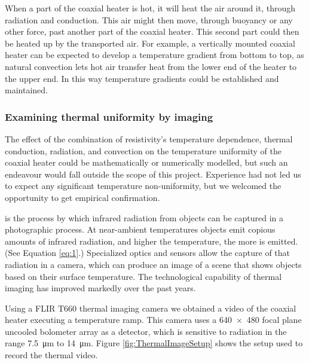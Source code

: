 When a part of the coaxial heater is hot, it will heat the air around it,
through radiation and conduction. This air might then move, through buoyancy or
any other force, past another part of the coaxial heater. This second part could
then be heated up by the transported air. For example, a vertically mounted
coaxial heater can be expected to develop a temperature gradient from bottom to
top, as natural convection lets hot air transfer heat from the lower end of the
heater to the upper end. In this way temperature gradients could be established
and maintained.

\subsubsection{Examining thermal uniformity by imaging}

The effect of the combination of resistivity's temperature dependence, thermal
conduction, radiation, and convection on the temperature uniformity of the
coaxial heater could be mathematically or numerically modelled, but such an
endeavour would fall outside the scope of this project. Experience had not led
us to expect any significant temperature non-uniformity, but we welcomed the 
opportunity to get empirical confirmation.

 is the process by which infrared radiation from objects
can be captured in a photographic process. At near-ambient temperatures objects
emit copious amounts of infrared radiation, and higher the temperature, the more
is emitted. (See Equation \ref{eq:1}.) Specialized optics and sensors allow the
capture of that radiation in a camera, which can produce an image of a scene
that shows objects based on their surface temperature. The technological
capability of thermal imaging has improved markedly over the past years.

Using a FLIR{\texttrademark} T660 thermal imaging camera we obtained a video of
the coaxial heater executing a temperature ramp. This camera uses a \num{640 x 480}
focal plane uncooled bolometer array as a detector, which is sensitive to
radiation in the range \SI{7.5}{\micro\metre} to \SI{14}{\micro\metre}.
Figure \ref{fig:ThermalImageSetup} shows the setup used to record the thermal
video.


